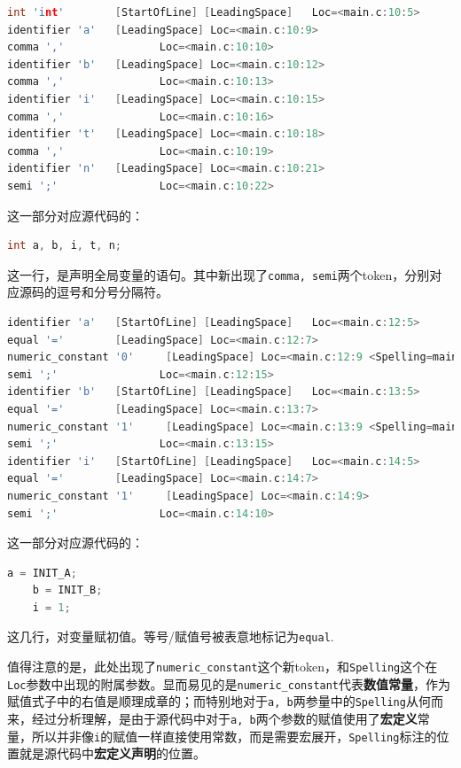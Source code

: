 \documentclass[UTF8,a4paper,10pt]{ctexart}
\begin{document}
\begin{lstlisting}[title=词法分析片段 2,frame=trbl,language={C++}]
int 'int'        [StartOfLine] [LeadingSpace]   Loc=<main.c:10:5>
identifier 'a'   [LeadingSpace] Loc=<main.c:10:9>
comma ','               Loc=<main.c:10:10>
identifier 'b'   [LeadingSpace] Loc=<main.c:10:12>
comma ','               Loc=<main.c:10:13>
identifier 'i'   [LeadingSpace] Loc=<main.c:10:15>
comma ','               Loc=<main.c:10:16>
identifier 't'   [LeadingSpace] Loc=<main.c:10:18>
comma ','               Loc=<main.c:10:19>
identifier 'n'   [LeadingSpace] Loc=<main.c:10:21>
semi ';'                Loc=<main.c:10:22>
\end{lstlisting}

这一部分对应源代码的：
\begin{lstlisting}[frame=trbl,language={C++}]
    int a, b, i, t, n;
\end{lstlisting}
这一行，是声明全局变量的语句。其中新出现了\texttt{comma, semi}两个token，分别对应源码的逗号和分号分隔符。

\vspace{1em}


\begin{lstlisting}[title=词法分析片段 3,frame=trbl,language={C++}]
identifier 'a'   [StartOfLine] [LeadingSpace]   Loc=<main.c:12:5>
equal '='        [LeadingSpace] Loc=<main.c:12:7>
numeric_constant '0'     [LeadingSpace] Loc=<main.c:12:9 <Spelling=main.c:4:16>>
semi ';'                Loc=<main.c:12:15>
identifier 'b'   [StartOfLine] [LeadingSpace]   Loc=<main.c:13:5>
equal '='        [LeadingSpace] Loc=<main.c:13:7>
numeric_constant '1'     [LeadingSpace] Loc=<main.c:13:9 <Spelling=main.c:5:16>>
semi ';'                Loc=<main.c:13:15>
identifier 'i'   [StartOfLine] [LeadingSpace]   Loc=<main.c:14:5>
equal '='        [LeadingSpace] Loc=<main.c:14:7>
numeric_constant '1'     [LeadingSpace] Loc=<main.c:14:9>
semi ';'                Loc=<main.c:14:10>
\end{lstlisting}

这一部分对应源代码的：
\begin{lstlisting}[frame=trbl,language={C++}]
    a = INIT_A;
    b = INIT_B;
    i = 1;
\end{lstlisting}
这几行，对变量赋初值。等号/赋值号被表意地标记为\texttt{equal}.

值得注意的是，此处出现了\texttt{numeric\_constant}这个新token，和\texttt{Spelling}这个在\texttt{Loc}参数中出现的附属参数。显而易见的是\texttt{numeric\_constant}代表\textbf{数值常量}，作为赋值式子中的右值是顺理成章的；而特别地对于\texttt{a, b}两参量中的\texttt{Spelling}从何而来，经过分析理解，是由于源代码中对于\texttt{a, b}两个参数的赋值使用了\textbf{宏定义}常量，所以并非像\texttt{i}的赋值一样直接使用常数，而是需要宏展开，\texttt{Spelling}标注的位置就是源代码中\textbf{宏定义声明}的位置。
\end{document}
